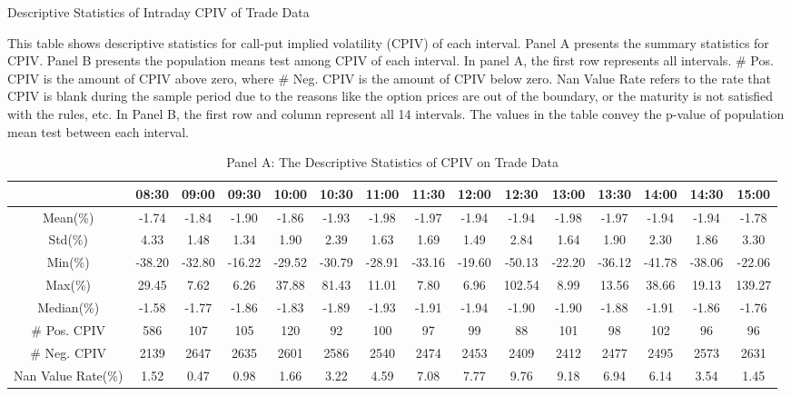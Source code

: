 \begin{table}[h]

\caption{Descriptive Statistics of Intraday CPIV of Trade Data}\label{table:stats_of_CPIV_2}
\begin{threeparttable}

\medskip

{\footnotesize 
This table shows descriptive statistics for call-put implied volatility (CPIV) of each interval. Panel A presents the summary statistics for CPIV. Panel B presents the population means test among CPIV of each interval. In panel A, the first row represents all intervals.  \# Pos. CPIV is the amount of CPIV above zero, where \# Neg. CPIV is the amount of CPIV below zero. Nan Value Rate refers to the rate that CPIV is blank during the sample period due to the reasons like the option prices are out of the boundary, or the maturity is not satisfied with the rules, etc. In Panel B, the first row and column represent all 14 intervals. The values in the table convey the p-value of population mean test between each interval. 
}


\begin{subtable}[t]{\linewidth}

\caption{Panel A: The Descriptive Statistics of CPIV on Trade Data }
\footnotesize

\begin{tabular}{ccccccccccccccc}
\toprule

                   & 08:30  & 09:00  & 09:30  & 10:00  & 10:30  & 11:00  & 11:30  & 12:00  & 12:30  & 13:00  & 13:30  & 14:00  & 14:30  & 15:00  \\ \midrule	
Mean(\%)           & -1.74  & -1.84  & -1.90  & -1.86  & -1.93  & -1.98  & -1.97  & -1.94  & -1.94  & -1.98  & -1.97  & -1.94  & -1.94  & -1.78  \\
Std(\%)            & 4.33   & 1.48   & 1.34   & 1.90   & 2.39   & 1.63   & 1.69   & 1.49   & 2.84   & 1.64   & 1.90   & 2.30   & 1.86   & 3.30   \\
Min(\%)            & -38.20 & -32.80 & -16.22 & -29.52 & -30.79 & -28.91 & -33.16 & -19.60 & -50.13 & -22.20 & -36.12 & -41.78 & -38.06 & -22.06 \\
Max(\%)            & 29.45  & 7.62   & 6.26   & 37.88  & 81.43  & 11.01  & 7.80   & 6.96   & 102.54 & 8.99   & 13.56  & 38.66  & 19.13  & 139.27 \\
Median(\%)         & -1.58  & -1.77  & -1.86  & -1.83  & -1.89  & -1.93  & -1.91  & -1.94  & -1.90  & -1.90  & -1.88  & -1.91  & -1.86  & -1.76  \\
\# Pos. CPIV       & 586    & 107    & 105    & 120    & 92     & 100    & 97     & 99     & 88     & 101    & 98     & 102    & 96     & 96     \\
\# Neg. CPIV       & 2139   & 2647   & 2635   & 2601   & 2586   & 2540   & 2474   & 2453   & 2409   & 2412   & 2477   & 2495   & 2573   & 2631   \\
Nan Value Rate(\%) & 1.52   & 0.47   & 0.98   & 1.66   & 3.22   & 4.59   & 7.08   & 7.77   & 9.76   & 9.18   & 6.94   & 6.14   & 3.54   & 1.45 
\\
\bottomrule
\end{tabular}
\end{subtable}



\end{threeparttable}
\end{table}
